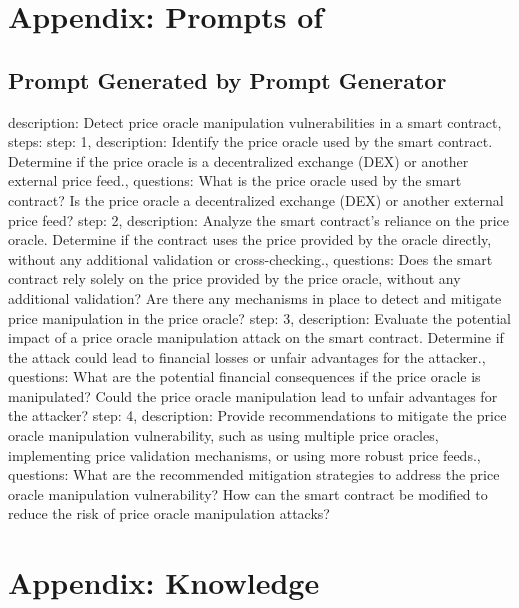 \appendix


\section{Appendix: Prompts of \tool} \label{app:componentprompts}
\subsection{Prompt Generated by Prompt Generator}
\begin{tcolorbox}[colback=gray!20, colframe=gray!50, title={Prompt Generated by Prompt Generator}, label=cotprompt]
description: Detect price oracle manipulation vulnerabilities in a smart contract,  steps:
step: 1, description: Identify the price oracle used by the smart contract. Determine if the price oracle is a decentralized exchange (DEX) or another external price feed.,      
    questions: What is the price oracle used by the smart contract?       
    Is the price oracle a decentralized exchange (DEX) or another external price feed?
step: 2, description: Analyze the smart contract's reliance on the price oracle. Determine if the contract uses the price provided by the oracle directly, without any additional validation or cross-checking.,     
    questions: Does the smart contract rely solely on the price provided by the price oracle, without any additional validation?
    Are there any mechanisms in place to detect and mitigate price manipulation in the price oracle?  
step: 3, description: Evaluate the potential impact of a price oracle manipulation attack on the smart contract. Determine if the attack could lead to financial losses or unfair advantages for the attacker.,      
    questions: What are the potential financial consequences if the price oracle is manipulated?       
    Could the price oracle manipulation lead to unfair advantages for the attacker? 
step: 4, description: Provide recommendations to mitigate the price oracle manipulation vulnerability, such as using multiple price oracles, implementing price validation mechanisms, or using more robust price feeds.,      
    questions: What are the recommended mitigation strategies to address the price oracle manipulation vulnerability?
    How can the smart contract be modified to reduce the risk of price oracle manipulation attacks?
\end{tcolorbox}

\section{Appendix: Knowledge}



